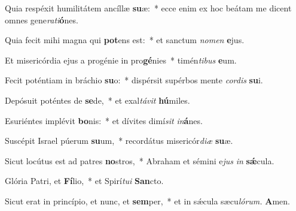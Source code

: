 \item Quia respéxit humilitátem ancíllæ \textbf{su}æ:~* ecce enim ex hoc beátam me dicent omnes gene\textit{rati}\textbf{ó}nes.
\item Quia fecit mihi magna qui \textbf{pot}ens est:~* et sanctum \textit{nomen} \textbf{e}jus.
\item Et misericórdia ejus a progénie in pro\textbf{gé}nies~* timén\textit{tibus} \textbf{e}um.
\item Fecit poténtiam in bráchio \textbf{su}o:~* dispérsit supérbos mente \textit{cordis} \textbf{su}i.
\item Depósuit poténtes de \textbf{se}de,~* et exal\textit{távit} \textbf{hú}miles.
\item Esuriéntes implévit \textbf{bo}nis:~* et dívites dimí\tinyhspace\textit{sit} \textit{in}\textbf{á}nes.
\item Suscépit Israel púerum \textbf{su}um,~* recordátus misericór\textit{diæ} \textbf{su}æ.
\item Sicut locútus est ad patres \textbf{no}stros,~* Abraham et sémini e\hspace*{0.02em}\textit{jus} \textit{in} \textbf{sǽ}cula.
\item Glória Patri, et \textbf{Fí}lio,~* et Spirí\tinyhspace\textit{tui} \textbf{San}cto.
\item Sicut erat in princípio, et nunc, et \textbf{sem}per,~* et in sǽcula sæcu\tinyhspace\textit{lórum.} \textbf{A}men.